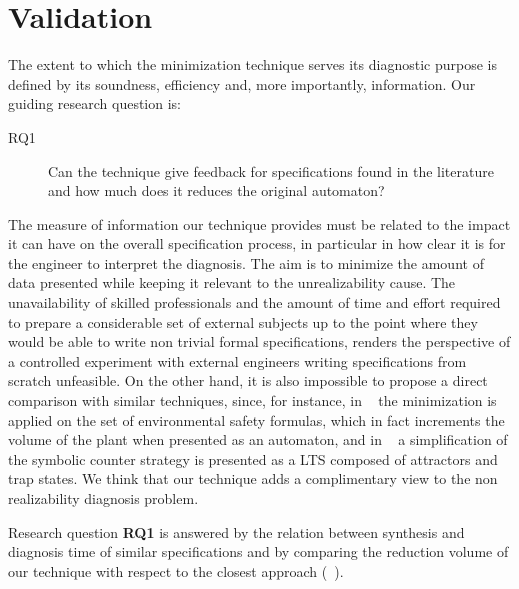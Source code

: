 \section{Validation}\label{sec:validation}
The extent to which the minimization technique serves its diagnostic purpose is defined by its soundness, efficiency and, more importantly, information. 
Our guiding research question is:
\begin{description}
	\item[RQ1] Can the technique give feedback for specifications found in the literature and how much does it reduces the original automaton?
\end{description}



The measure of information our technique provides must be related to the impact it can have on the overall specification process, in particular in how clear it is for the engineer  to interpret the diagnosis. The aim is to minimize the amount of data presented while keeping it relevant to the unrealizability cause. The unavailability of skilled professionals and the amount of time and effort required to prepare a considerable set of external subjects up to the point where they would be able to write non trivial formal specifications, renders the perspective of a controlled experiment with external engineers writing specifications from scratch unfeasible. On the other hand, it is also impossible to propose a direct comparison with similar techniques, since, for instance, in ~\cite{DBLP:conf/hvc/KonighoferHB10} the minimization is applied on the set of environmental safety formulas, which in fact increments the volume of the plant when presented as an automaton, and in ~\cite{DBLP:conf/sigsoft/KuventMR17} a simplification of the symbolic counter strategy is presented as a LTS composed of attractors and trap states. We think that our technique adds a complimentary view to the non realizability diagnosis problem.

Research question \textbf{RQ1} is answered by the relation between synthesis and diagnosis time of similar specifications and by comparing the reduction volume of our technique with respect to the closest approach (~\cite{DBLP:conf/hvc/KonighoferHB10}). 

